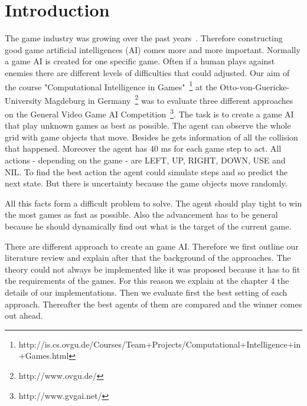 \section{Introduction} 
\label{sec:intro}


The game industry was growing over the past years~\cite{gartner}. Therefore 
constructing good game artificial intelligences (AI) comes more and more important.
Normally a game AI is created for one specific game. Often if a human plays against
enemies there are different levels of difficulties that could adjusted.
Our aim of the course "Computational Intelligence in Games"~\footnote{http://is.cs.ovgu.de/Courses/Team+Projects/Computational+Intelligence+in+Games.html} at the Otto-von-Guericke-University Magdeburg in Germany~\footnote{http://www.ovgu.de/} was
to evaluate three different approaches on the General Video Game AI Competition~\footnote{http://www.gvgai.net/}.
The task is to create a game AI that play unknown games as best as possible. The agent can observe the
whole grid with game objects that move. Besides he gets information of all the collision that happened.
Moreover the agent has 40 ms for each game step to act. All actions - depending on the game - are  LEFT, UP, RIGHT, DOWN, USE and NIL.
To find the best action the agent could simulate steps and so predict the next state.
But there is uncertainty because the game objects move randomly.

All this facts form a difficult problem to solve. The agent should play tight to win the most games as fast as possible. 
Also the advancement has to be general because he should dynamically find out what is the target of the current game.

There are different approach to create an game AI. Therefore we first outline our literature review and explain after that
the background of the approaches. The theory could not always be implemented like it was proposed because it has to
fit the requirements of the games. For this reason we explain at the chapter 4 the details of our implementations.
Then we evaluate first the best setting of each approach. Thereafter the best agents of them are compared and the
winner comes out ahead.








